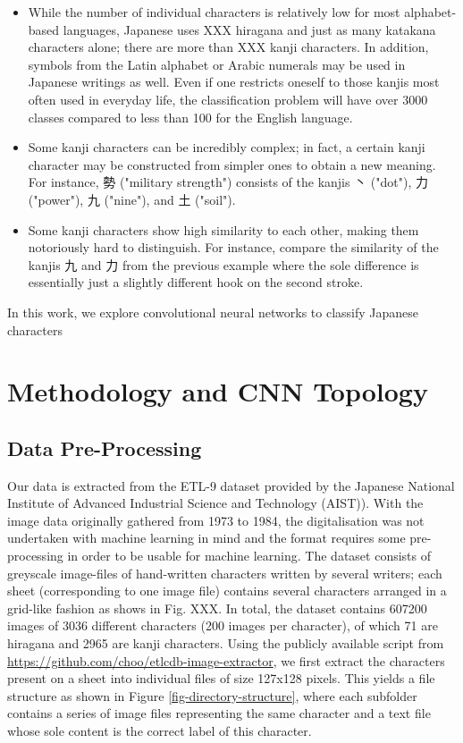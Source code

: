 \documentclass[british,12p]{article}
\begin{document}
    \begin{itemize}
    	\item While the number of individual characters is relatively low for most alphabet-based languages, Japanese uses XXX hiragana and just as many katakana characters alone; there are more than XXX kanji characters.  In addition, symbols from the Latin alphabet or Arabic numerals may be used in Japanese writings as well. Even if one restricts oneself to those kanjis most often used in everyday life, the classification problem will have over 3000 classes compared to less than 100 for the English language.
    	\item Some kanji characters can be incredibly complex; in fact, a certain kanji character may be constructed from simpler ones to obtain a new meaning.  For instance, 勢 ("military strength") consists of the kanjis 丶 ("dot"), 力 ("power"), 九 ("nine"), and 土 ("soil").
       	\item Some kanji characters show high similarity to each other, making them notoriously hard to distinguish. For instance, compare the similarity of the kanjis 九 and 力 from the previous example where the sole difference is essentially just a slightly different hook on the second stroke.	
    \end{itemize}


    
    
     In this work, we explore convolutional neural networks to classify Japanese characters
    \section{Methodology and CNN Topology}
    \subsection{Data Pre-Processing}\label{secPreProcess}
    Our data is extracted from the ETL-9 dataset provided by the Japanese National Institute of Advanced Industrial Science and Technology (AIST)). With the image data originally gathered from 1973 to 1984, the digitalisation was not undertaken with machine learning in mind and the format requires some pre-processing in order to be usable for machine learning. The dataset consists of greyscale image-files of hand-written characters written by several writers; each sheet (corresponding to one image file) contains several characters arranged in a grid-like fashion as shows in Fig. XXX. In total, the dataset contains 607200 images of 3036 different characters (200 images per character), of which 71 are hiragana and 2965 are kanji characters.
    	Using the publicly available script from \url{https://github.com/choo/etlcdb-image-extractor}, we first extract the characters present on a sheet into individual files of size 127x128 pixels. This yields a file structure as shown in Figure \ref{fig-directory-structure}, where each subfolder contains a series of image files representing the same character and a text file whose sole content is the correct label of this character.
    	
\end{document}
